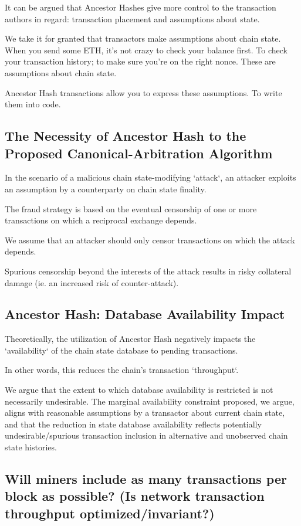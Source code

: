 \documentclass[11pt]{article}
\theoremstyle{plain}
\begin{document}
It can be argued that Ancestor Hashes give more control to the transaction
authors in regard: transaction placement and assumptions about state.

We take it for granted that transactors make assumptions about chain state.
When you send some ETH, it's not crazy to check your balance first. To check
your transaction history; to make sure you're on the right nonce.
These are assumptions about chain state. 

Ancestor Hash transactions allow you to express these assumptions. To write
them into code.

\subsection{\small{The Necessity of Ancestor Hash to the Proposed
Canonical-Arbitration Algorithm}}

In the scenario of a malicious chain state-modifying `attack`, an attacker
exploits an assumption by a counterparty on chain state finality.

The fraud strategy is based on the eventual censorship of one or more
transactions on which a reciprocal exchange depends.

We assume that an attacker should only censor transactions on which the attack
depends.

Spurious censorship beyond the interests of the attack results in risky
collateral damage (ie. an increased risk of counter-attack).


\subsection{\small{Ancestor Hash: Database Availability Impact}}

Theoretically, the utilization of Ancestor Hash negatively impacts the
`availability` of the chain state database to pending transactions.

In other words, this reduces the chain's transaction `throughput`.

We argue that the extent to which database availability is restricted is not
necessarily undesirable.
The marginal availability constraint proposed, we argue, aligns with reasonable
assumptions by a transactor about current chain state,
and that the reduction in state database availability reflects potentially
undesirable/spurious transaction inclusion in alternative
and unobserved chain state histories.

\subsection{\small{Will miners include as many transactions per block as
possible? (Is network transaction throughput optimized/invariant?)}}
\end{document}
